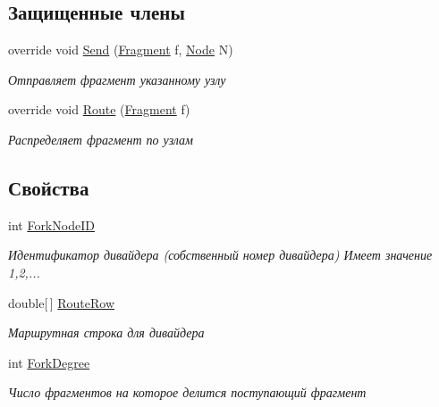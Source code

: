 \subsection*{Защищенные члены}
\begin{DoxyCompactItemize}
\item 
override void \hyperlink{class_network_simulator_1_1_fork_node_aa61ec4b939488e78ac16865249f764f4}{Send} (\hyperlink{class_network_simulator_1_1_fragment}{Fragment} f, \hyperlink{class_network_simulator_1_1_node}{Node} N)
\begin{DoxyCompactList}\small\item\em Отправляет фрагмент указанному узлу \end{DoxyCompactList}\item 
override void \hyperlink{class_network_simulator_1_1_fork_node_a2268305e06c8e851a6faf2db79c89c58}{Route} (\hyperlink{class_network_simulator_1_1_fragment}{Fragment} f)
\begin{DoxyCompactList}\small\item\em Распределяет фрагмент по узлам \end{DoxyCompactList}\end{DoxyCompactItemize}
\subsection*{Свойства}
\begin{DoxyCompactItemize}
\item 
int \hyperlink{class_network_simulator_1_1_fork_node_a13432354bc104beb3ec98ba28d4966cb}{Fork\+Node\+ID}
\begin{DoxyCompactList}\small\item\em Идентификатор дивайдера (собственный номер дивайдера) Имеет значение 1,2,... \end{DoxyCompactList}\item 
double\mbox{[}$\,$\mbox{]} \hyperlink{class_network_simulator_1_1_fork_node_afcdd23cd37381679ba4f364e0c5b1854}{Route\+Row}
\begin{DoxyCompactList}\small\item\em Маршрутная строка для дивайдера \end{DoxyCompactList}\item 
int \hyperlink{class_network_simulator_1_1_fork_node_afce4020751cd59e8715309dae27501c8}{Fork\+Degree}
\begin{DoxyCompactList}\small\item\em Число фрагментов на которое делится поступающий фрагмент \end{DoxyCompactList}\end{DoxyCompactItemize}
